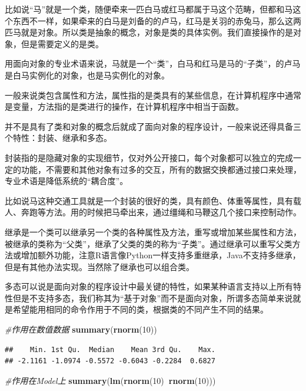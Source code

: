 \documentclass[]{book}
\newenvironment{Shaded}{\begin{snugshade}}{\end{snugshade}}
\newcommand{\KeywordTok}[1]{\textcolor[rgb]{0.13,0.29,0.53}{\textbf{#1}}}
\newcommand{\DecValTok}[1]{\textcolor[rgb]{0.00,0.00,0.81}{#1}}
\newcommand{\CommentTok}[1]{\textcolor[rgb]{0.56,0.35,0.01}{\textit{#1}}}
\newcommand{\OperatorTok}[1]{\textcolor[rgb]{0.81,0.36,0.00}{\textbf{#1}}}
\newcommand{\NormalTok}[1]{#1}
\begin{document}
比如说``马''就是一个类，随便牵来一匹白马或红马都属于马这个范畴，但都和马这个东西不一样，如果牵来的白马是刘备的的卢马，红马是关羽的赤兔马，那么这两匹马就是对象。所以类是抽象的概念，对象是类的具体实例。我们直接操作的是对象，但是需要定义的是类。

用面向对象的专业术语来说，马就是一个``类''，白马和红马是马的``子类''，的卢马是白马实例化的对象，也是马实例化的对象。

一般来说类包含属性和方法，属性指的是类具有的某些信息，在计算机程序中通常是变量，方法指的是类进行的操作，在计算机程序中相当于函数。

并不是具有了类和对象的概念后就成了面向对象的程序设计，一般来说还得具备三个特性：封装、继承和多态。

封装指的是隐藏对象的实现细节，仅对外公开接口，每个对象都可以独立的完成一定的功能，不需要和其他对象有过多的交互，所有的数据交换都通过接口来处理，专业术语是降低系统的``耦合度''。

比如说马这种交通工具就是一个封装的很好的类，具有颜色、体重等属性，具有载人、奔跑等方法。用的时候把马牵出来，通过缰绳和马鞭这几个接口来控制动作。

继承是一个类可以继承另一个类的各种属性及方法，重写或增加某些属性和方法，被继承的类称为``父类''，继承了父类的类的称为``子类''。通过继承可以重写父类方法或增加额外功能，注意R语言像Python一样支持多重继承，Java不支持多继承，但是有其他办法实现。当然除了继承也可以组合类。

多态可以说是面向对象的程序设计中最关键的特性，如果某种语言支持以上所有特性但是不支持多态，我们称其为``基于对象''而不是面向对象，所谓多态简单来说就是希望能用相同的命令作用于不同的类，根据类的不同产生不同的结果。

\begin{Shaded}
\begin{Highlighting}[]
\CommentTok{#作用在数值数据}
\KeywordTok{summary}\NormalTok{(}\KeywordTok{rnorm}\NormalTok{(}\DecValTok{10}\NormalTok{))}
\end{Highlighting}
\end{Shaded}

\begin{verbatim}
##    Min. 1st Qu.  Median    Mean 3rd Qu.    Max. 
## -2.1161 -1.0974 -0.5572 -0.6043 -0.2284  0.6827
\end{verbatim}

\begin{Shaded}
\begin{Highlighting}[]
\CommentTok{#作用在Model上}
\KeywordTok{summary}\NormalTok{(}\KeywordTok{lm}\NormalTok{(}\KeywordTok{rnorm}\NormalTok{(}\DecValTok{10}\NormalTok{)}\OperatorTok{~}\KeywordTok{rnorm}\NormalTok{(}\DecValTok{10}\NormalTok{)))}
\end{Highlighting}
\end{Shaded}
\end{document}
